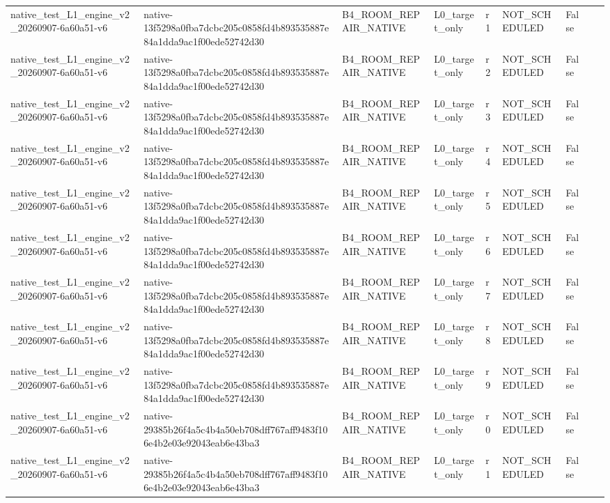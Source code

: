 \begin{tabular}{lllllllll}
native\_test\_L1\_engine\_v2\_20260907-6a60a51-v6 & native-13f5298a0fba7dcbc205c0858fd4b893535887e84a1dda9ac1f00ede52742d30 & B4\_ROOM\_REPAIR\_NATIVE & L0\_target\_only & r1 & NOT\_SCHEDULED & False &  &  \\
native\_test\_L1\_engine\_v2\_20260907-6a60a51-v6 & native-13f5298a0fba7dcbc205c0858fd4b893535887e84a1dda9ac1f00ede52742d30 & B4\_ROOM\_REPAIR\_NATIVE & L0\_target\_only & r2 & NOT\_SCHEDULED & False &  &  \\
native\_test\_L1\_engine\_v2\_20260907-6a60a51-v6 & native-13f5298a0fba7dcbc205c0858fd4b893535887e84a1dda9ac1f00ede52742d30 & B4\_ROOM\_REPAIR\_NATIVE & L0\_target\_only & r3 & NOT\_SCHEDULED & False &  &  \\
native\_test\_L1\_engine\_v2\_20260907-6a60a51-v6 & native-13f5298a0fba7dcbc205c0858fd4b893535887e84a1dda9ac1f00ede52742d30 & B4\_ROOM\_REPAIR\_NATIVE & L0\_target\_only & r4 & NOT\_SCHEDULED & False &  &  \\
native\_test\_L1\_engine\_v2\_20260907-6a60a51-v6 & native-13f5298a0fba7dcbc205c0858fd4b893535887e84a1dda9ac1f00ede52742d30 & B4\_ROOM\_REPAIR\_NATIVE & L0\_target\_only & r5 & NOT\_SCHEDULED & False &  &  \\
native\_test\_L1\_engine\_v2\_20260907-6a60a51-v6 & native-13f5298a0fba7dcbc205c0858fd4b893535887e84a1dda9ac1f00ede52742d30 & B4\_ROOM\_REPAIR\_NATIVE & L0\_target\_only & r6 & NOT\_SCHEDULED & False &  &  \\
native\_test\_L1\_engine\_v2\_20260907-6a60a51-v6 & native-13f5298a0fba7dcbc205c0858fd4b893535887e84a1dda9ac1f00ede52742d30 & B4\_ROOM\_REPAIR\_NATIVE & L0\_target\_only & r7 & NOT\_SCHEDULED & False &  &  \\
native\_test\_L1\_engine\_v2\_20260907-6a60a51-v6 & native-13f5298a0fba7dcbc205c0858fd4b893535887e84a1dda9ac1f00ede52742d30 & B4\_ROOM\_REPAIR\_NATIVE & L0\_target\_only & r8 & NOT\_SCHEDULED & False &  &  \\
native\_test\_L1\_engine\_v2\_20260907-6a60a51-v6 & native-13f5298a0fba7dcbc205c0858fd4b893535887e84a1dda9ac1f00ede52742d30 & B4\_ROOM\_REPAIR\_NATIVE & L0\_target\_only & r9 & NOT\_SCHEDULED & False &  &  \\
native\_test\_L1\_engine\_v2\_20260907-6a60a51-v6 & native-29385b26f4a5c4b4a50eb708dff767aff9483f106e4b2e03e92043eab6e43ba3 & B4\_ROOM\_REPAIR\_NATIVE & L0\_target\_only & r0 & NOT\_SCHEDULED & False &  &  \\
native\_test\_L1\_engine\_v2\_20260907-6a60a51-v6 & native-29385b26f4a5c4b4a50eb708dff767aff9483f106e4b2e03e92043eab6e43ba3 & B4\_ROOM\_REPAIR\_NATIVE & L0\_target\_only & r1 & NOT\_SCHEDULED & False &  &  \\

\end{tabular}
